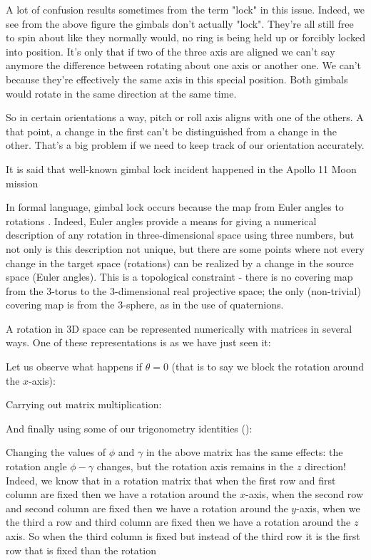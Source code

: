 	A lot of confusion results sometimes from the term "lock" in this issue. Indeed, we see from the above figure the gimbals don't actually "lock". They're all still free to spin about like they normally would, no ring is being held up or forcibly locked into position. It's only that if two of the three axis are aligned we can't say anymore  the difference between rotating about one axis or another one. We can't because they're effectively the same axis in this special position. Both gimbals would rotate in the same direction at the same time.

	So in certain orientations a way, pitch or roll axis aligns with one of the others. A that point, a change in the first can't be distinguished from a change in the other. That's a big problem if we need to keep track of our orientation accurately. 
	
	\begin{tcolorbox}[title=Remark,colframe=black,arc=10pt]
	It is said that well-known gimbal lock incident happened in the Apollo 11 Moon mission
	\end{tcolorbox}
	In formal language, gimbal lock occurs because the map from Euler angles to rotations . Indeed, Euler angles provide a means for giving a numerical description of any rotation in three-dimensional space using three numbers, but not only is this description not unique, but there are some points where not every change in the target space (rotations) can be realized by a change in the source space (Euler angles). This is a topological constraint - there is no covering map from the 3-torus to the 3-dimensional real projective space; the only (non-trivial) covering map is from the 3-sphere, as in the use of quaternions.

	A rotation in 3D space can be represented numerically with matrices in several ways. One of these representations is as we have just seen it:
	
	Let us observe what happens if $\theta=0$ (that is to say we block the rotation around the $x$-axis):
	
	Carrying out matrix multiplication:
	
	And finally using some of our trigonometry identities ():
	
	Changing the values of $\phi$ and $\gamma$  in the above matrix has the same effects: the rotation angle $\phi-\gamma$ changes, but the rotation axis remains in the $z$ direction! Indeed, we know that in a rotation matrix that when the first row and first column are fixed then we have a rotation around the $x$-axis, when the second row and second column are fixed then we have a rotation around the $y$-axis, when we the third a row and third column are fixed then we have a rotation around the $z$ axis. So when the third column is fixed but instead of the third row it is the first row that is fixed than the rotation
	
